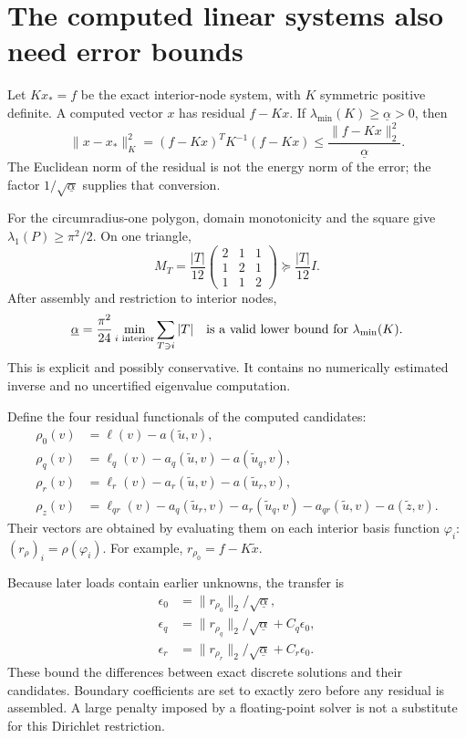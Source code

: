 \section{The computed linear systems also need error bounds}
\label{l2:algebraic}
Let $Kx_*=f$ be the exact interior-node system, with $K$ symmetric positive
definite. A computed vector $x$ has residual $f-Kx$. If
$\lambda_{\min}(K)\geq\underline\alpha>0$, then
\[
 \|x-x_*\|_K^2=(f-Kx)^TK^{-1}(f-Kx)
 \leq \frac{\|f-Kx\|_2^2}{\underline\alpha}.
\]
The Euclidean norm of the residual is not the energy norm of the error;
the factor $1/\sqrt{\underline\alpha}$ supplies that conversion.

For the circumradius-one polygon, domain monotonicity and the square give
$\lambda_1(P)\geq\pi^2/2$. On one triangle,
\[
 M_T=\frac{|T|}{12}
 \begin{pmatrix}2&1&1\\1&2&1\\1&1&2\end{pmatrix}
 \succeq\frac{|T|}{12}I.
\]
After assembly and restriction to interior nodes,
\begin{equation}
 \underline\alpha=
 \frac{\pi^2}{24}\min_{i\text{ interior}}\sum_{T\ni i}|T|
 \quad\hbox{is a valid lower bound for }\lambda_{\min}(K).
 \label{l2:coercivity}
\end{equation}
This is explicit and possibly conservative. It contains no numerically
estimated inverse and no uncertified eigenvalue computation.

Define the four residual functionals of the computed candidates:
\begin{align*}
 \rho_0(v)&=\ell(v)-a(\widetilde u,v),\\
 \rho_q(v)&=\ell_q(v)-a_q(\widetilde u,v)-a(\widetilde u_q,v),\\
 \rho_r(v)&=\ell_r(v)-a_r(\widetilde u,v)-a(\widetilde u_r,v),\\
 \rho_z(v)&=\ell_{qr}(v)-a_q(\widetilde u_r,v)
 -a_r(\widetilde u_q,v)-a_{qr}(\widetilde u,v)-a(\widetilde z,v).
\end{align*}
Their vectors are obtained by evaluating them on each interior basis
function $\varphi_i$: $(r_\rho)_i=\rho(\varphi_i)$. For example,
$r_{\rho_0}=f-K\widetilde x$.

Because later loads contain earlier unknowns, the transfer is
\begin{align*}
 \epsilon_0&=\|r_{\rho_0}\|_2/\sqrt{\underline\alpha},\\
 \epsilon_q&=\|r_{\rho_q}\|_2/\sqrt{\underline\alpha}+C_q\epsilon_0,\\
 \epsilon_r&=\|r_{\rho_r}\|_2/\sqrt{\underline\alpha}+C_r\epsilon_0.
\end{align*}
These bound the differences between exact discrete solutions and their
candidates. Boundary coefficients are set to exactly zero before any
residual is assembled. A large penalty imposed by a floating-point
solver is not a substitute for this Dirichlet restriction.

